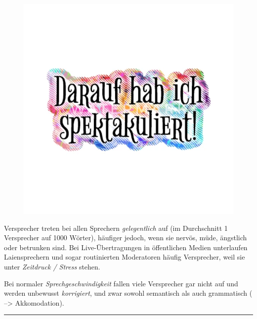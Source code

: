 \documentclass[
  letterpaper,
]{scrbook}
\begin{document}
\begin{figure}

{\centering 

\href{https://www.spreadshirt.de/shop/design/spektakel+farben+wortspiel+freudscher+versprecher+laetzchen-D5c00c8ae5fd3e424dc819325?sellable=yrwD10aLwvs9vJdpgqNV-235-205}{\includegraphics[width=1\textwidth,height=\textheight]{./pictures/spektakel-farben-wortspiel-freudscher-versprecher-laetzchen.png}}

}

\end{figure}

Versprecher treten bei allen Sprechern \emph{gelegentlich} auf (im
Durchschnitt 1 Versprecher auf 1000 Wörter), häufiger jedoch, wenn sie
nervös, müde, ängstlich oder betrunken sind. Bei Live-Übertragungen in
öffentlichen Medien unterlaufen Laiensprechern und sogar routinierten
Moderatoren häufig Versprecher, weil sie unter \emph{Zeitdruck / Stress}
stehen.

Bei normaler \emph{Sprechgeschwindigkeit} fallen viele Versprecher gar
nicht auf und werden unbewusst \emph{korrigiert}, und zwar sowohl
semantisch als auch grammatisch ( --\textgreater{} Akkomodation).

\begin{center}\rule{0.5\linewidth}{0.5pt}\end{center}
\end{document}
